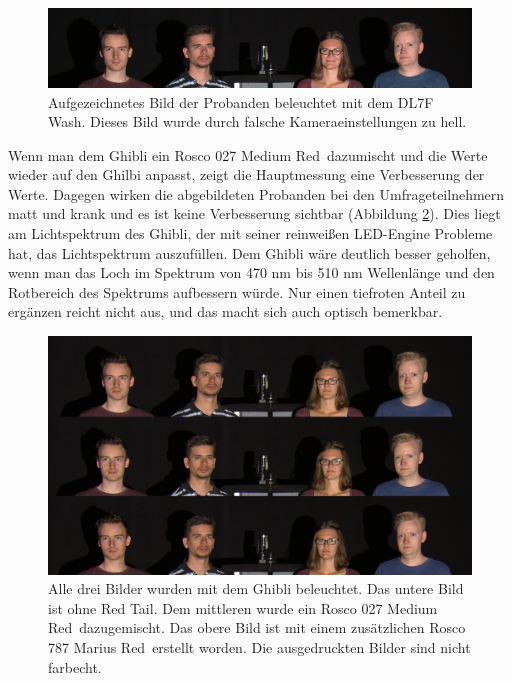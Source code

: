 \begin{figure}[H]     %
\centering
\includegraphics[width=1.0\textwidth]{bilder/umfragedl7fkaputt} 
\caption {Aufgezeichnetes Bild der Probanden beleuchtet mit dem DL7F Wash. Dieses Bild wurde durch falsche Kameraeinstellungen zu hell.} \label{b_umfragedl7fkaputt}
\end{figure}



Wenn man dem Ghibli ein Rosco 027 \glqq Medium Red\grqq\ dazumischt und die Werte wieder auf den Ghilbi anpasst, zeigt die Hauptmessung eine Verbesserung der Werte. Dagegen wirken die abgebildeten Probanden bei den Umfrageteilnehmern matt und krank und es ist keine Verbesserung sichtbar (Abbildung \ref{b_vergleich2}). Dies liegt am Lichtspektrum des Ghibli, der mit seiner reinweißen LED-Engine Probleme hat, das Lichtspektrum auszufüllen. Dem Ghibli wäre deutlich besser geholfen, wenn man das Loch im Spektrum von 470 nm bis 510 nm Wellenlänge und den Rotbereich des Spektrums aufbessern würde. Nur einen tiefroten Anteil zu ergänzen reicht nicht aus, und das macht sich auch optisch bemerkbar.\\

\begin{figure}[H]     %
\centering
\includegraphics[width=1.0\textwidth]{bilder/vergleich2} 
\caption {Alle drei Bilder wurden mit dem Ghibli beleuchtet. Das untere Bild ist ohne \glqq Red Tail\grqq . Dem mittleren wurde ein Rosco 027 \glqq Medium Red\grqq\ dazugemischt. Das obere Bild ist mit einem zusätzlichen Rosco 787 \glqq Marius Red\grqq\ erstellt worden. Die ausgedruckten Bilder sind nicht farbecht.} \label{b_vergleich2}
\end{figure}


